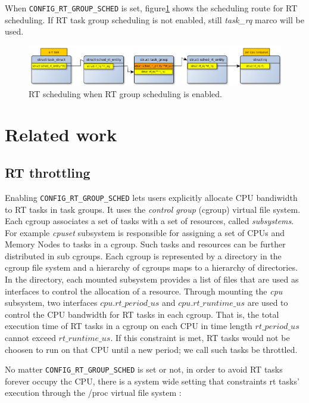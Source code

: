 When \texttt{CONFIG\_RT\_GROUP\_SCHED} is set, figure\ref{fig:rt_scheme_tg} 
shows the scheduling route for RT scheduling. If RT task group scheduling is 
not enabled, still \emph{task\_rq} marco will be used.
\begin{figure}[htbp]
        \centering
        \includegraphics[width=\textwidth]{images/rt_scheduling_scheme_tg}
        \caption{RT scheduling when RT group scheduling is enabled.}
        \label{fig:rt_scheme_tg}
\end{figure}

\section{Related work\label{sec:RelatedWork}}
\subsection{RT throttling\label{sec:RelatedWork_RT}}
Enabling \texttt{CONFIG\_RT\_GROUP\_SCHED} lets users explicitly allocate
CPU bandiwidth to RT tasks in task groups. It uses the \emph{control group}
(cgroup) virtual file system. Each cgroup associates a set of tasks with
a set of resources, called \emph{subsystems}. For example \emph{cpuset} 
subsystem is responsible for assigning a set of CPUs and Memory Nodes to
tasks in a cgroup. Such tasks and resources can be further distributed in 
sub cgroups. Each cgroup is represented by a directory in the cgroup file 
system and a hierarchy of cgroups maps to a hierarchy of directories. In 
the directory, each mounted subsystem provides a list of files that are used 
as interfaces to control the allocation of a resource.
Through mounting the \emph{cpu} subsystem, two interfaces $cpu.rt\_period\_us$ 
and $cpu.rt\_runtime\_us$ are used to control the CPU bandwidth for RT 
tasks in each cgroup. That is, the total execution time of RT tasks in a cgroup 
on each CPU in time length $rt\_period\_us$ cannot exceed $rt\_runtime\_us$. 
If this constraint is met, RT tasks would not be choosen to run on that CPU 
until a new period; we call such tasks be throttled.

No matter \texttt{CONFIG\_RT\_GROUP\_SCHED} is set or not, in order to avoid RT 
tasks forever occupy thc CPU, there is a system wide setting that constraints
rt tasks' execution through the /proc virtual file system :

